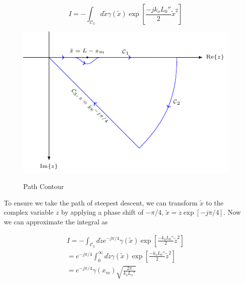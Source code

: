 \begin{equation}
I = -\int_{\mathcal{C}_3}d\tilde{x} \gamma(\tilde{x})\exp\left[\frac{-jk_oL_0''}{2}\tilde{x}^2\right]
\label{mp_eq:24}
\end{equation}

\begin{figure}[H]
  \begin{center}
\includegraphics[width=5in]{../media/path_contour-figure1.pdf}
  \end{center}
  \renewcommand{\baselinestretch}{1} \small\normalsize
  \begin{quote}
    \caption[Path Contour]{ Path Contour\label{mp_fig:6}}
  \end{quote}
\end{figure}
\renewcommand{\baselinestretch}{2} \small\normalsize

To ensure we take the path of steepest descent, we can transform $\tilde{x}$ to the complex variable $z$ by applying a phase shift of $-\pi/4$, $\tilde{x} = z\exp[-j\pi/4]$. Now we can approximate the integral as

\begin{equation}
\begin{gathered}
I = -\int_{\mathcal{C}_3}d\tilde{z}e^{-j\pi/4} \gamma(\tilde{x})\exp\left[\frac{-k_oL_0''}{2}\tilde{z}^2\right]  \\
= e^{-j\pi/4}\int_{0}^{\infty}d\tilde{z}\gamma(\tilde{x})\exp\left[\frac{-k_oL_0''}{2}\tilde{z}^2\right]  \\
= e^{-j\pi/4}\gamma(x_m)\sqrt{\frac{2\pi}{k_oL_o''}} \\
\end{gathered}
\label{mp_eq:25}
\end{equation}

